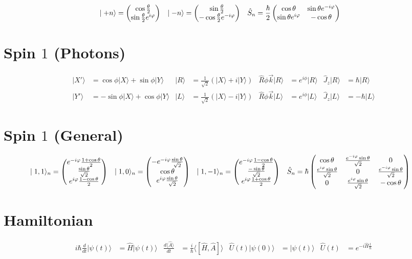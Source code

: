 \documentclass{article}
\newcommand{\mysection}[1]{\vspace{-2em}
\section*{#1}
\vspace{-2em}}
\newcommand{\ket}[1]{\ensuremath{\mid#1\rangle}}
\newcommand{\expect}[1]{\ensuremath{\langle#1\rangle}}
\newcommand{\op}[1]{\ensuremath{\hat#1}}
\newcommand{\mat}[1]{\ensuremath{\begin{pmatrix}\ensuremath{#1}\end{pmatrix}}}
\begin{document}
	\begin{align*}
		\ket{+n}&=\mat{\cos\frac{\theta}{2}\\
			\sin\frac{\theta}{2}e^{i\varphi}} &
		\ket{-n}&=\mat{\sin\frac{\theta}{2}\\
			-\cos\frac{\theta}{2}e^{-i\varphi}} &
		\op{S_n}&=\frac{\hbar}{2}\mat{\cos\theta&\sin\theta e^{-i\varphi}\\
			\sin\theta e^{i\varphi}&-\cos\theta} %
	\end{align*}
	\mysection{Spin $1$ (Photons)}
	\begin{align*}
		\ket{X'}&=\cos\phi\ket{X}+\sin\phi\ket{Y} &
		\ket{R}&=\frac{1}{\sqrt{2}}(\ket{X}+i\ket{Y}) &
		\op{R\phi\vec{k}}\ket{R}&=e^{i\phi}\ket{R} &
		\op{J_z}\ket{R}&=\hbar\ket{R} \\
		\ket{Y'}&=-\sin\phi\ket{X}+\cos\phi\ket{Y} &
		\ket{L}&=\frac{1}{\sqrt{2}}(\ket{X}-i\ket{Y}) &
		\op{R\phi\vec{k}}\ket{L}&=e^{i\phi}\ket{L} &
		\op{J_z}\ket{L}&=-\hbar\ket{L}
	\end{align*}
	\mysection{Spin $1$ (General)}
	\begin{align*}
		\ket{1,1}_n&=\mat{e^{-i\varphi}\frac{1+\cos\theta}{2}\\
			\frac{\sin\theta}{\sqrt2}\\
			e^{i\varphi}\frac{1-\cos\theta}{2}} &
		\ket{1,0}_n&=\mat{-e^{-i\varphi}\frac{\sin\theta}{\sqrt2}\\
			\cos\theta\\e^{i\varphi}\frac{\sin\theta}{\sqrt2}} &
		\ket{1,-1}_n&=\mat{e^{-i\varphi}\frac{1-\cos\theta}{2}\\
			\frac{-\sin\theta}{\sqrt2}\\
			e^{i\varphi}\frac{1+\cos\theta}{2}} &
		\op{S_n}&=\hbar\mat{
			\cos\theta&\frac{e^{-i\varphi}\sin\theta}{\sqrt2}&0\\
			\frac{e^{i\varphi}\sin\theta}{\sqrt{2}}&0&
				\frac{e^{-i\varphi}\sin\theta}{\sqrt2}\\
			0&\frac{e^{i\varphi}\sin\theta}{\sqrt2}&-\cos\theta}
	\end{align*}
	\mysection{Hamiltonian}
	\begin{align*}
		i\hbar\frac{d}{dt}\ket{\psi(t)}&=\op{H}\ket{\psi(t)} &
		\frac{d\expect{\op{A}}}{dt}&=\frac{i}{\hbar}\expect{[\op{H},\op{A}]} &
		\op{U(t)}\ket{\psi(0)}&=\ket{\psi(t)} &
		\op{U(t)}&=e^{-i\op{H}\frac{t}{\hbar}}
	\end{align*}
\end{document}
